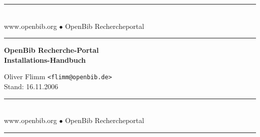 \documentclass[11pt, twoside, a4paper, BCOR8mm, DIV12, bibtotoc,idxtotoc]{scrbook}
\begin{document}
\frontmatter

\begin{titlepage}

\begin{center}
\rule[-.1in]{16cm}{1mm}\\[3mm]
{\fontsize{20}{20pt}\selectfont
  www.openbib.org $\bullet$ OpenBib Rechercheportal}\\[-2mm]
\rule[-.1in]{16cm}{1mm}

\vspace{5cm}

  \textbf{\fontsize{30}{30pt}\selectfont OpenBib Recherche-Portal\\[3mm] Installations-Handbuch}

  \vspace{2cm}

  Oliver Flimm \texttt{<flimm@openbib.de>}\\
  Stand: 16.11.2006

  \vspace{8cm}

\rule[-.1in]{16cm}{1mm}\\[3mm]
{\fontsize{20}{20pt}\selectfont
  www.openbib.org $\bullet$ OpenBib Rechercheportal}\\[-2mm]
\rule[-.1in]{16cm}{1mm}

\end{center}

\end{titlepage}






\tableofcontents
\end{document}
